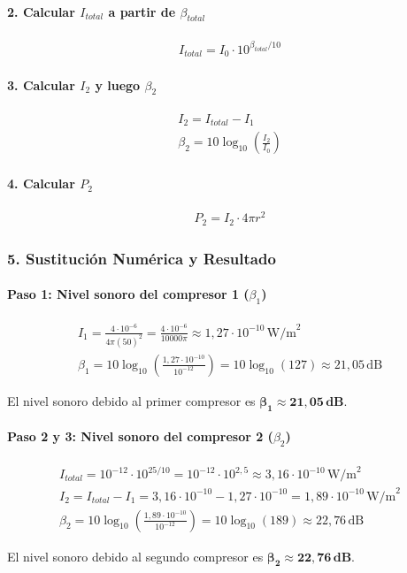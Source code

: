 \paragraph*{2. Calcular $I_{total}$ a partir de $\beta_{total}$}
\begin{gather}
    I_{total} = I_0 \cdot 10^{\beta_{total}/10}
\end{gather}
\paragraph*{3. Calcular $I_2$ y luego $\beta_2$}
\begin{gather}
    I_2 = I_{total} - I_1 \\
    \beta_2 = 10 \log_{10}\left(\frac{I_2}{I_0}\right)
\end{gather}
\paragraph*{4. Calcular $P_2$}
\begin{gather}
    P_2 = I_2 \cdot 4\pi r^2
\end{gather}

\subsubsection*{5. Sustitución Numérica y Resultado}
\paragraph*{Paso 1: Nivel sonoro del compresor 1 ($\beta_1$)}
\begin{gather}
    I_1 = \frac{4 \cdot 10^{-6}}{4\pi (50)^2} = \frac{4 \cdot 10^{-6}}{10000\pi} \approx 1,27 \cdot 10^{-10} \, \text{W/m}^2 \\
    \beta_1 = 10 \log_{10}\left(\frac{1,27 \cdot 10^{-10}}{10^{-12}}\right) = 10 \log_{10}(127) \approx 21,05 \, \text{dB}
\end{gather}
\begin{cajaresultado}
    El nivel sonoro debido al primer compresor es $\boldsymbol{\beta_1 \approx 21,05 \, \textbf{dB}}$.
\end{cajaresultado}

\paragraph*{Paso 2 y 3: Nivel sonoro del compresor 2 ($\beta_2$)}
\begin{gather}
    I_{total} = 10^{-12} \cdot 10^{25/10} = 10^{-12} \cdot 10^{2,5} \approx 3,16 \cdot 10^{-10} \, \text{W/m}^2 \\
    I_2 = I_{total} - I_1 = 3,16 \cdot 10^{-10} - 1,27 \cdot 10^{-10} = 1,89 \cdot 10^{-10} \, \text{W/m}^2 \\
    \beta_2 = 10 \log_{10}\left(\frac{1,89 \cdot 10^{-10}}{10^{-12}}\right) = 10 \log_{10}(189) \approx 22,76 \, \text{dB}
\end{gather}
\begin{cajaresultado}
    El nivel sonoro debido al segundo compresor es $\boldsymbol{\beta_2 \approx 22,76 \, \textbf{dB}}$.
\end{cajaresultado}

